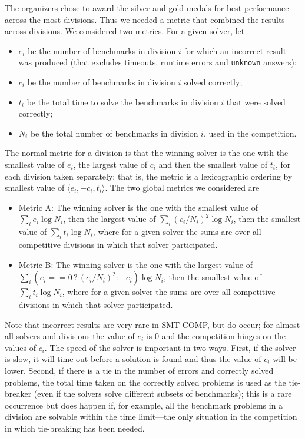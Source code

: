 \documentclass[twoside,11pt]{article}
\begin{document}
The organizers chose to award the silver and gold medals for best performance across the most divisions. Thus we needed a metric that combined the results across divisions. We considered two metrics. For a given solver, let
\begin{itemize}[noitemsep,nolistsep]
\item $e_i$ be the number of benchmarks in division $i$ for which an incorrect result was produced (that excludes timeouts, runtime errors and \lstinline{unknown} answers);
\item $c_i$ be the number of benchmarks in division $i$ solved correctly;
\item $t_i$ be the total time to solve the benchmarks in division $i$ that were solved correctly;
\item $N_i$ be the total number of benchmarks in division $i$, used in the competition.
\end{itemize}
The normal metric for a division is that the winning solver is the one with the
smallest value of $e_i$, the largest value of $c_i$
and then the smallest value of $t_i$, for each division taken separately;
that is, the metric is a lexicographic ordering by smallest value of $\langle e_i, -c_i, t_i \rangle$.
The two global metrics we considered are
\begin{itemize}[noitemsep,nolistsep]
\item Metric A: The winning solver is the one with the smallest value of $\sum_i e_i \log N_i$, then the largest value of $\sum_i (c_i/N_i)^2 \log N_i$, then the smallest value of $\sum_i t_i \log N_i$, where for a given solver the sums are over all competitive divisions in which that solver participated.
\item Metric B: The winning solver is the one with the largest value of $\sum_i (e_i == 0\,?\,(c_i/N_i)^2 : - e_i ) \log N_i$, then the smallest value of $\sum_i t_i \log N_i$, where for a given solver the sums are over all competitive divisions in which that solver participated.
\end{itemize}

Note that incorrect results are very rare in SMT-COMP, but do occur; for almost all solvers and divisions the value of $e_i$ is 0 and the competition hinges on the values of $c_i$. The speed of the solver is important in two ways. First, if the solver is slow, it will time out before a solution is found and thus the value of $c_i$ will be lower. Second, if there is a tie in the number of errors and correctly solved problems, the total time taken on the correctly solved problems is used as the tie-breaker (even if the solvers solve different subsets of benchmarks); this is a rare occurrence but does happen if, for example, all the benchmark problems in a division are solvable within the time limit---the only situation in the competition in which tie-breaking has been needed. 
\end{document}
